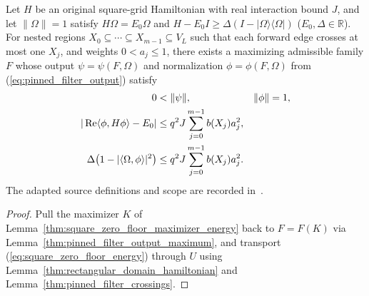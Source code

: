 \begin{lemma}
    \label{thm:pinned_square_maximizer_energy}
    \leanok
    Let $H$ be an original square-grid Hamiltonian with real interaction bound $J$, and let $\|\Omega\|=1$ satisfy $H\Omega=E_0\Omega$ and $H-E_0I\ge\Delta(I-|\Omega\rangle\langle\Omega|)$ ($E_0,\Delta\in\mathbb R$). For nested regions $X_0\subseteq\cdots\subseteq X_{m-1}\subseteq V_L$ such that each forward edge crosses at most one $X_j$, and weights $0<a_j\le1$, there exists a maximizing admissible family $F$ whose output $\psi=\psi(F,\Omega)$ and normalization $\phi=\phi(F,\Omega)$ from (\ref{eq:pinned_filter_output}) satisfy
    \begin{align}
        0 & <\|\psi\|,                                  & \|\phi\| & =1, \notag \\
        |\operatorname{Re}\langle\phi,H\phi\rangle-E_0|
          & \le q^2J\sum_{j=0}^{m-1}b(X_j)a_j^2, \notag                         \\
        \Delta\bigl(1-|\langle\Omega,\phi\rangle|^2\bigr)
          & \le q^2J\sum_{j=0}^{m-1}b(X_j)a_j^2.
        \label{eq:pinned_square_energy}
    \end{align}
    The adapted source definitions and scope are recorded in~\cite{gap:polypeps_square_zero_floor_optimizer_scope}.
\end{lemma}
\begin{proof}
    \leanok
    Pull the maximizer $K$ of Lemma~\ref{thm:square_zero_floor_maximizer_energy} back to $F=F(K)$ via Lemma~\ref{thm:pinned_filter_output_maximum}, and transport (\ref{eq:square_zero_floor_energy}) through $U$ using Lemma~\ref{thm:rectangular_domain_hamiltonian} and Lemma~\ref{thm:pinned_filter_crossings}.
\end{proof}
